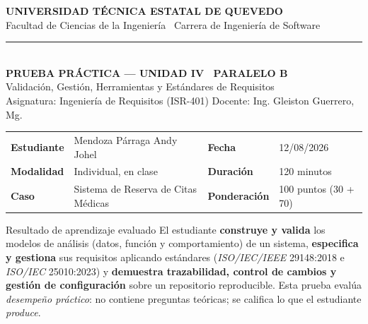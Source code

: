\documentclass[11pt,a4paper,oneside]{article}
\begin{document}
	\begin{center}
		{\Large\bfseries\color{darkblue} UNIVERSIDAD T\'ECNICA ESTATAL DE QUEVEDO}\\[2pt]
		{\normalsize\color{midblue} Facultad de Ciencias de la Ingenier\'ia \textbullet\ Carrera de Ingenier\'ia de Software}\\[6pt]
		{\color{gold}\rule{0.9\linewidth}{1.2pt}}\\[6pt]
		{\large\bfseries\color{darkblue} PRUEBA PR\'ACTICA --- UNIDAD IV \textbullet\ PARALELO B}\\[2pt]
		{\normalsize\color{darkblue} Validaci\'on, Gesti\'on, Herramientas y Est\'andares de Requisitos}\\[2pt]
		{\small\color{black} Asignatura: Ingenier\'ia de Requisitos (ISR-401) \quad\textbullet\quad Docente: Ing. Gleiston Guerrero, Mg.}
	\end{center}
	
	\vspace{2pt}
	\begin{center}\small
		\begin{tabularx}{\linewidth}{@{}L{2.6cm} X L{2.6cm} X@{}}
			\toprule
			\textbf{Estudiante} & Mendoza P\'arraga Andy Johel & \textbf{Fecha} & 12/08/2026\\
			\textbf{Modalidad} & Individual, en clase & \textbf{Duraci\'on} & 120 minutos \\
			\textbf{Caso} & Sistema de Reserva de Citas M\'edicas & \textbf{Ponderaci\'on} & 100 puntos (30 + 70) \\
			\bottomrule
		\end{tabularx}
	\end{center}
	
	\begin{concepto}{Resultado de aprendizaje evaluado}
		El estudiante \textbf{construye y valida} los modelos de an\'alisis (datos, funci\'on y comportamiento) de un sistema, \textbf{especifica y gestiona} sus requisitos aplicando est\'andares (\textit{ISO/IEC/IEEE} 29148:2018 e \textit{ISO/IEC} 25010:2023) y \textbf{demuestra trazabilidad, control de cambios y gesti\'on de configuraci\'on} sobre un repositorio reproducible. Esta prueba eval\'ua \emph{desempe\~no pr\'actico}: no contiene preguntas te\'oricas; se califica lo que el estudiante \emph{produce}.
	\end{concepto}
	
\end{document}
